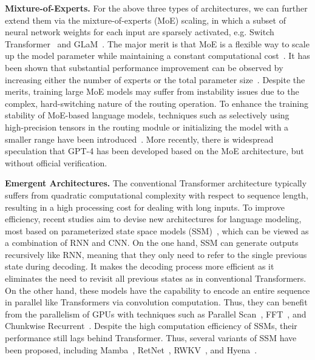 {\textbf{Mixture-of-Experts.} For the above three types of architectures, we can  further extend  them via  the mixture-of-experts (MoE) scaling, in which a subset of neural network weights for each input are sparsely activated, e.g. Switch Transformer~\cite{Fedus-JMLR-2021-Switch} and GLaM~\cite{Du-ICML-2022-GLaM}. {The major merit is that MoE is a flexible way to scale up the model parameter while maintaining a constant computational cost~\cite{Fedus-JMLR-2021-Switch}.} It has been shown that substantial  performance improvement can be observed by increasing either the number of experts or the total parameter size~\cite{Clark-ICML-2022-Unified}.  {Despite the merits, training large MoE models may suffer from instability issues due to the complex, hard-switching nature of the routing operation. To enhance the training stability of MoE-based language models, techniques such as selectively using high-precision tensors in the routing module or initializing the model with a smaller range have been introduced~\cite{Fedus-JMLR-2021-Switch}. More recently, there is widespread speculation that GPT-4 has been developed based on the MoE architecture, but without official verification. } 

\textcolor{blue}{

}

\textbf{Emergent Architectures.} The conventional Transformer architecture typically suffers from quadratic computational complexity with respect to sequence length, resulting in a high processing cost for dealing with long inputs. To improve efficiency, recent studies aim to devise new architectures for language modeling, most based on parameterized state space models {(SSM)~\cite{gu-2022-iclr-efficiently}}, which can be viewed as a combination of RNN and CNN. On the one hand, SSM can generate outputs recursively like RNN, meaning that they only need to refer to the single previous state during decoding. It makes the decoding process more efficient as it eliminates the need to revisit all previous states as in conventional Transformers. On the other hand, these models have the capability to encode an entire sequence in parallel like Transformers via convolution computation. Thus, they can benefit from the parallelism of GPUs with techniques such as Parallel Scan~\cite{smith-2023-iclr-s5,orvieto-2023-icml-lru}, FFT~\cite{poli-2023-icml-hyena,peng-2023-arxiv-rwkv}, and Chunkwise Recurrent~\cite{sun-2023-arxiv-retnet}. Despite the high computation efficiency of SSMs, their performance still lags behind Transformer. Thus, several variants of SSM have been proposed, including Mamba~\cite{gu-arxiv-2023-mamba}, RetNet~\cite{sun-2023-arxiv-retnet}, RWKV~\cite{peng-23-arxiv-rwkv}, and Hyena~\cite{poli-2023-icml-hyena}. 

}
